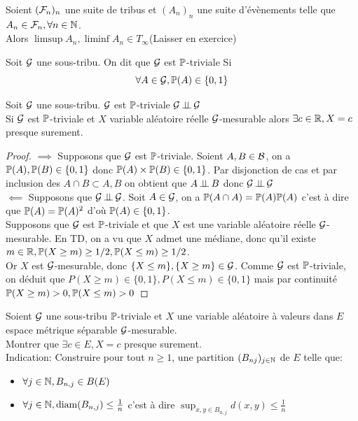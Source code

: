 \documentclass[]{report}
\begin{document}
    \begin{ex}{}{}
        Soient $(\mathcal{F}_n)_n$ une suite de tribus et $(A_n)_n$ une suite d'évènements telle que $A_n\in \mathcal{F}_n,\forall n\in \mathbb{N}$.\\
        Alors $\limsup A_n,\liminf A_n\in T_{\infty}$(Laisser en exercice)
    \end{ex}

    \begin{df}{}{}
        Soit $\mathcal{G}$ une sous-tribu. On dit que $\mathcal{G}$ est $\mathbb{P}$-triviale Si
        \[\forall A\in \mathcal{G},\mathbb{P}(A)\in \{0,1\}\]
    \end{df}

    \begin{lm}{}{}
        Soit $\mathcal{G}$ une sous-tribu. $\mathcal{G}$ est $\mathbb{P}$-triviale \ssi $\mathcal{G} \operatorname{\perp \!\!\! \perp} \mathcal{G}$\\
        Si $\mathcal{G}$ est $\mathbb{P}$-triviale et $X$ variable aléatoire réelle $\mathcal{G}$-mesurable alors $\exists c\in \mathbb{R}, X=c$ presque surement.
    \end{lm}

    \begin{proof}
        $\implies$ Supposons que $\mathcal{G}$ est $\mathbb{P}$-triviale. Soient $A,B\in \mathcal{B}$, on a $\mathbb{P}(A),\mathbb{P}(B)\in\{0,1\}$ donc $\mathbb{P}(A)\times \mathbb{P}(B)\in \{0,1\}$. Par disjonction de cas et par inclusion des $A\cap B\subset A,B$ on obtient que $A\operatorname{\perp \!\!\! \perp} B$ donc $\mathcal{G}\operatorname{\perp \!\!\! \perp} \mathcal{G}$\\
        $\impliedby$ Supposons que $\mathcal{G}\operatorname{\perp \!\!\! \perp}\mathcal{G}$. Soit $A\in \mathcal{G}$, on a $\mathbb{P}(A\cap A)=\mathbb{P}(A) \mathbb{P}(A)$ c'est à dire que $\mathbb{P}(A)=\mathbb{P}(A)^2$ d'où $\mathbb{P}(A)\in\{0,1\}$.\\
        Supposons que $\mathcal{G}$ est $\mathbb{P}$-triviale et que $X$ est une variable aléatoire réelle $\mathcal{G}$-mesurable. En TD, on a vu que $X$ admet une médiane, donc qu'il existe $m\in \mathbb{R},\mathbb{P}(X\ge m)\ge 1/2,\mathbb{P}(X\le m)\ge 1/2$.\\
        Or $X$ est $\mathcal{G}$-mesurable, donc $\{X\le m\},\{X\ge m\}\in \mathcal{G}$. Comme $\mathcal{G}$ est $\mathbb{P}$-triviale, on déduit que $P(X\ge m)\in \{0,1\},P(X\le m)\in \{0,1\}$ mais par continuité $\mathbb{P}(X\ge m)>0,\mathbb{P}(X\le m)>0$
    \end{proof}

    \begin{exo}{}{}
        Soient $\mathcal{G}$ une sous-tribu $\mathbb{P}$-triviale et $X$ une variable aléatoire à valeurs dans $E$ espace métrique séparable $\mathcal{G}$-mesurable.\\
        Montrer que $\exists c\in E, X=c$ presque surement.\\
        Indication: Construire pour tout $n\ge 1$, une partition $(B_{nj})_{j\in \mathbb{N}}$ de $E$ telle que:
        \begin{itemize}
            \item $\forall j\in \mathbb{N},B_{n,j}\in B(E)$
            \item $\forall j\in \mathbb{N}, \text{diam} (B_{n,j})\le \frac{1}{n}$ c'est à dire $\sup_{x,y\in B_{n,j}}d(x,y)\le \frac{1}{n}$
        \end{itemize}
    \end{exo}
\end{document}
